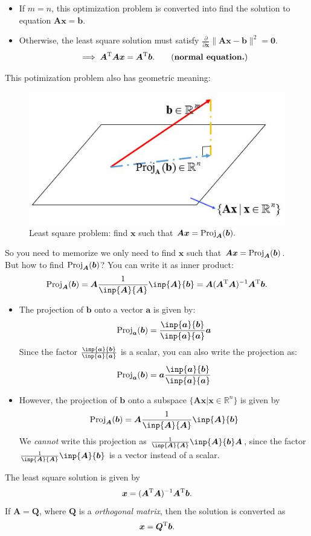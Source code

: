 \begin{itemize}
\item
If $m=n$, this optimization problem is converted into find the solution to equation $\bm{Ax}=\bm b$.
\item
Otherwise, the least square solution must satisfy $\frac{\partial }{\partial \bm x}\|\bm{Ax}-\bm b\|^2=\bm 0$.
\[
\implies\bm A^{\mathrm T}\bm A\bm x=\bm A^{\mathrm T}\bm b.\qquad\text{(\textbf{normal equation.})}
\]
\end{itemize}
This potimization problem also has geometric meaning:
\begin{figure}[H]
\centering\includegraphics{week6/least_square}
\caption{Least square problem: find $\bm x$ such that $\bm{Ax}=\operatorname{Proj}_{\bm A}(\bm b).$}
\end{figure}
So you need to memorize we only need to find $\bm x$ such that $\bm{Ax}=\operatorname{Proj}_{\bm A}(\bm b)$.\\
But how to find $\operatorname{Proj}_{\bm A}(\bm b)$? You can write it as inner product:
\[
\Proj_{\bm A}(\bm b)=\bm A\frac{1}{\inp{\bm A}{\bm A}}\inp{\bm A}{\bm b}
=\bm A(\bm A\trans\bm A)^{-1}\bm A\trans\bm b.
\]
\begin{remark}
\begin{itemize}
\item
The projection of $\bm b$ onto a vector $\bm a$ is given by:
\[
\Proj_{\bm a}(\bm b)=\frac{\inp{\bm a}{\bm b}}{\inp{\bm a}{\bm a}}\bm a
\]
Since the factor $\frac{\inp{\bm a}{\bm b}}{\inp{\bm a}{\bm a}}$ is a scalar, you can also write the projection as:
\[
\Proj_{\bm a}(\bm b)=\bm a\frac{\inp{\bm a}{\bm b}}{\inp{\bm a}{\bm a}}
\]
\item
However, the projection of $\bm b$ onto a subspace $\{\bm{Ax}|\bm x\in\mathbb{R}^{n}\}$ is given by
\[
\Proj_{\bm A}(\bm b)=\bm A\frac{1}{\inp{\bm A}{\bm A}}\inp{\bm A}{\bm b}
\]
We \emph{cannot} write this projection as $\frac{1}{\inp{\bm A}{\bm A}}\inp{\bm A}{\bm b}\bm A$, since the factor $\frac{1}{\inp{\bm A}{\bm A}}\inp{\bm A}{\bm b}$ is a vector instead of a scalar.
\enlargethispage{1cm}
\end{itemize}
\end{remark}
The least square solution is given by
\[
\bm x=(\bm A^{\mathrm T}\bm A)^{-1}\bm A^{\mathrm T}\bm b.
\]
If $\bm A=\bm Q$, where $\bm Q$ is a \textit{orthogonal matrix}, then the solution is converted as 
\[
\bm x=\bm Q^{\mathrm T}\bm b.
\]
